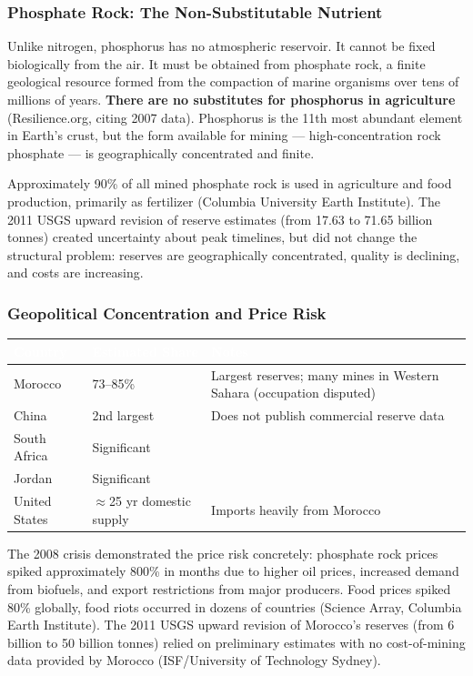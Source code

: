 \documentclass[11pt,letterpaper]{article}
\newcommand{\tableheader}[1]{\textbf{\sffamily\textcolor{white}{#1}}}
\begin{document}
\subsubsection{Phosphate Rock: The Non-Substitutable Nutrient}

Unlike nitrogen, phosphorus has no atmospheric reservoir. It cannot be fixed biologically from the air. It must be obtained from phosphate rock, a finite geological resource formed from the compaction of marine organisms over tens of millions of years. \textbf{There are no substitutes for phosphorus in agriculture} (Resilience.org, citing 2007 data). Phosphorus is the 11th most abundant element in Earth's crust, but the form available for mining --- high-concentration rock phosphate --- is geographically concentrated and finite.

Approximately 90\% of all mined phosphate rock is used in agriculture and food production, primarily as fertilizer (Columbia University Earth Institute). The 2011 USGS upward revision of reserve estimates (from 17.63 to 71.65 billion tonnes) created uncertainty about peak timelines, but did not change the structural problem: reserves are geographically concentrated, quality is declining, and costs are increasing.

\subsubsection{Geopolitical Concentration and Price Risk}

\begin{center}
\begin{tabularx}{\textwidth}{L{3.5cm}L{3cm}X}
\toprule
{}
\tableheader{Country} & \tableheader{Estimated Share} & \tableheader{Notes} \\
\midrule
Morocco & 73--85\% & Largest reserves; many mines in Western Sahara (occupation disputed) \\
China & 2nd largest & Does not publish commercial reserve data \\
South Africa & Significant & \\
Jordan & Significant & \\
United States & $\approx$25 yr domestic supply & Imports heavily from Morocco \\
\bottomrule
\end{tabularx}
\end{center}

The 2008 crisis demonstrated the price risk concretely: phosphate rock prices spiked approximately 800\% in months due to higher oil prices, increased demand from biofuels, and export restrictions from major producers. Food prices spiked 80\% globally, food riots occurred in dozens of countries (Science Array, Columbia Earth Institute). The 2011 USGS upward revision of Morocco's reserves (from 6 billion to 50 billion tonnes) relied on preliminary estimates with no cost-of-mining data provided by Morocco (ISF/University of Technology Sydney).
\end{document}
